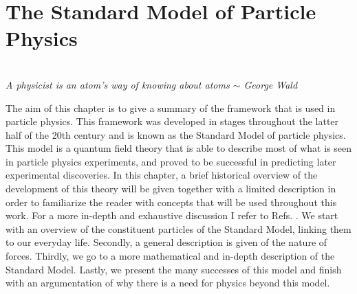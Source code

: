 \chapter{The Standard Model of Particle Physics}
\label{ch:SM}
\begin{flushright}
\textit{\\A physicist is an atom's way of knowing about atoms $\sim$ George Wald\\}
\end{flushright}

\noindent The aim of this chapter is to give a summary of the framework that is used in particle physics.
This framework was developed in stages throughout the latter half of the 20th century and is known as the Standard Model of particle physics.
This model is a quantum field theory that is able to describe most of what is seen in particle physics experiments, and proved to be successful in predicting later experimental discoveries.
In this chapter, a brief historical overview of the development of this theory will be given together with a limited description in order to familiarize the reader with concepts that will be used throughout this work.
For a more in-depth and exhaustive discussion I refer to Refs. \cite{Povh,Peskin:1995ev,Agashe:2014kda,Bettini:2008zz}. We start with an overview of the constituent particles of the Standard Model, linking them to our everyday life. Secondly, a general description is given of the nature of forces. Thirdly, we go to a more mathematical and in-depth description of the Standard Model. Lastly, we present the many successes of this model and finish with an argumentation of why there is a need for physics beyond this model.

